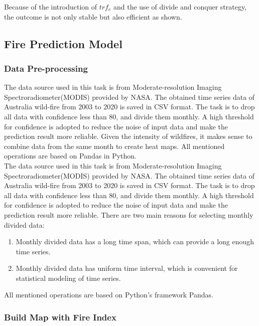 \documentclass[../main]{subfiles}
\begin{document}
Because of the introduction of \(trf_e\) and the use of divide and
conquer strategy, the outcome is not only stable but also efficient as
shown.


\subsection{Fire Prediction Model}

\hypertarget{data-pre-processing}{%
\subsubsection{Data Pre-processing}\label{data-pre-processing}}

The data source used in this task is from Moderate-resolution Imaging
Spectroradiometer(MODIS) provided by NASA. The obtained time series data
of Australia wild-fire from 2003 to 2020 is saved in CSV format. The
task is to drop all data with confidence less than 80, and divide them
monthly. A high threshold for confidence is adopted to reduce the noise
of input data and make the prediction result more reliable. Given the
intensity of wildfires, it makes sense to combine data from the same
month to create heat maps. All mentioned operations are based on Pandas
in Python.\\
The data source used in this task is from Moderate-resolution Imaging
Spectroradiometer(MODIS) provided by NASA. The obtained time series data
of Australia wild-fire from 2003 to 2020 is saved in CSV format. The
task is to drop all data with confidence less than 80, and divide them
monthly. A high threshold for confidence is adopted to reduce the noise
of input data and make the prediction result more reliable. There are
two main reasons for selecting monthly divided data:

\begin{enumerate}
\def\labelenumi{\arabic{enumi}.}
\item
  Monthly divided data has a long time span, which can provide a long
  enough time series.
\item
  Monthly divided data has uniform time interval, which is convenient
  for statistical modeling of time series.
\end{enumerate}

All mentioned operations are based on Python's framework Pandas.

\hypertarget{build-map-with-fire-index}{%
\subsubsection{Build Map with Fire
Index}\label{build-map-with-fire-index}}
\end{document}
